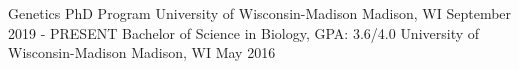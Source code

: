 
\begin{cventries}
  \cventry
    {Genetics PhD Program} %
    {University of Wisconsin-Madison} %
    {Madison, WI} %
    {September 2019 - PRESENT} %
    {
    }
   \cventry
    {Bachelor of Science in Biology, GPA: 3.6/4.0} %
    {University of Wisconsin-Madison} %
    {Madison, WI} %
    {May 2016} %
\end{cventries}
